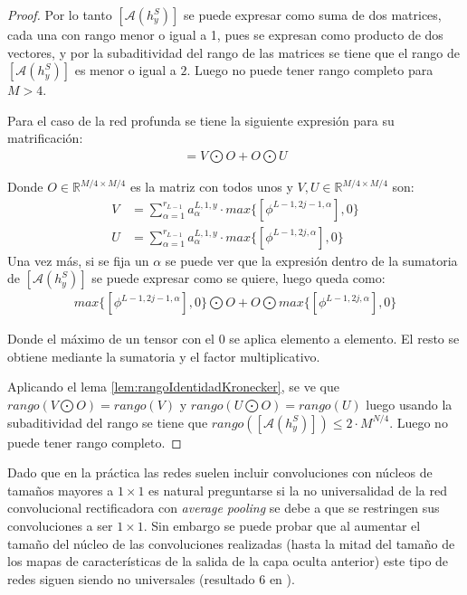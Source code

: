 \begin{proof}
Por lo tanto $[\mathcal{A}(h_y^S)]$ se puede expresar como suma de dos matrices, cada una con rango menor o igual a 1, pues se expresan como producto de dos vectores, y por la subaditividad del rango de las matrices se tiene que el rango de $[\mathcal{A}(h_y^S)]$ es menor o igual a $2$. Luego no puede tener rango completo para $M>4$.

Para el caso de la red profunda se tiene la siguiente expresión para su matrificación:
\begin{align*}
[\mathcal{A}(h_y^S)]= V\bigodot O + O\bigodot U
\end{align*}

Donde $O\in\mathbb{R}^{M/4 \times M/4}$ es la matriz con todos unos y $V,U\in\mathbb{R}^{M/4 \times M/4}$ son:
\begin{align*}
V &= \sum^{r_{L-1}}_{\alpha=1}a_\alpha^{L,1,y}\cdot max\{[\phi^{L-1,2j-1,\alpha}],0\}\\
U &= \sum^{r_{L-1}}_{\alpha=1}a_\alpha^{L,1,y}\cdot max\{[\phi^{L-1,2j,\alpha}],0\}
\end{align*}
Una vez más, si se fija un $\alpha$ se puede ver que la expresión dentro de la sumatoria de $[\mathcal{A}(h_y^S)]$ se puede expresar como se quiere, luego queda como:
\begin{align*}
max\{[\phi^{L-1,2j-1,\alpha}],0\}\bigodot O + O\bigodot max\{[\phi^{L-1,2j,\alpha}],0\}
\end{align*}  

Donde el máximo de un tensor con el $0$ se aplica elemento a elemento. El resto se obtiene mediante la sumatoria y el factor multiplicativo.

Aplicando el lema \ref{lem:rangoIdentidadKronecker}, se ve que $rango(V\bigodot O) =  rango(V)$ y $rango(U\bigodot O) =  rango(U)$ luego usando la subaditividad del rango se tiene que $rango([\mathcal{A}(h_y^S)])\leq 2\cdot M^{N/4}$. Luego no puede tener rango completo.
\end{proof}

Dado que en la práctica las redes suelen incluir convoluciones con núcleos de tamaños mayores a $1\times 1$ es natural preguntarse si la no universalidad de la red convolucional rectificadora con \textit{average pooling} se debe a que se restringen sus convoluciones a ser $1 \times 1$. Sin embargo se puede probar que al aumentar el tamaño del núcleo de las convoluciones realizadas (hasta la mitad del tamaño de los mapas de características de la salida de la capa oculta anterior) este tipo de redes siguen siendo no universales (resultado 6 en \cite{DBLP:journals/corr/CohenS16}).


